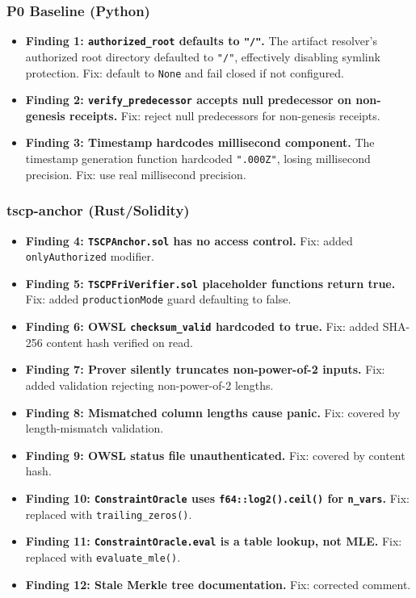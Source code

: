 \documentclass[11pt,a4paper]{article}
\begin{document}
\subsubsection{P0 Baseline (Python)}

\begin{itemize}
\item \textbf{Finding 1: \texttt{authorized\_root} defaults to \texttt{"/"}.} The artifact resolver's authorized root directory defaulted to \texttt{"/"}, effectively disabling symlink protection. Fix: default to \texttt{None} and fail closed if not configured.
\item \textbf{Finding 2: \texttt{verify\_predecessor} accepts null predecessor on non-genesis receipts.} Fix: reject null predecessors for non-genesis receipts.
\item \textbf{Finding 3: Timestamp hardcodes millisecond component.} The timestamp generation function hardcoded \texttt{".000Z"}, losing millisecond precision. Fix: use real millisecond precision.
\end{itemize}

\subsubsection{tscp-anchor (Rust/Solidity)}

\begin{itemize}
\item \textbf{Finding 4: \texttt{TSCPAnchor.sol} has no access control.} Fix: added \texttt{onlyAuthorized} modifier.
\item \textbf{Finding 5: \texttt{TSCPFriVerifier.sol} placeholder functions return true.} Fix: added \texttt{productionMode} guard defaulting to false.
\item \textbf{Finding 6: OWSL \texttt{checksum\_valid} hardcoded to true.} Fix: added SHA-256 content hash verified on read.
\item \textbf{Finding 7: Prover silently truncates non-power-of-2 inputs.} Fix: added validation rejecting non-power-of-2 lengths.
\item \textbf{Finding 8: Mismatched column lengths cause panic.} Fix: covered by length-mismatch validation.
\item \textbf{Finding 9: OWSL status file unauthenticated.} Fix: covered by content hash.
\item \textbf{Finding 10: \texttt{ConstraintOracle} uses \texttt{f64::log2().ceil()} for \texttt{n\_vars}.} Fix: replaced with \texttt{trailing\_zeros()}.
\item \textbf{Finding 11: \texttt{ConstraintOracle.eval} is a table lookup, not MLE.} Fix: replaced with \texttt{evaluate\_mle()}.
\item \textbf{Finding 12: Stale Merkle tree documentation.} Fix: corrected comment.
\end{itemize}
\end{document}
